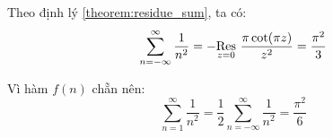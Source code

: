 Theo định lý \ref{theorem:residue_sum}, ta có:
\begin{equation*}
	 \sum_{n=-\infty}^{\infty} \frac{1}{n^2}=-\Res{\frac{\pi \cot(\pi z)}{z^2}}{z=0}  = \frac{\pi^2}3
\end{equation*}

Vì hàm $f(n)$ chẵn nên:
\begin{equation*}
	\sum_{n=1}^\infty \frac 1 {n^2} = \frac{1}{2}\sum_{n=-\infty}^{\infty} \frac{1}{n^2} = \frac{\pi^2}{6}
\end{equation*}
